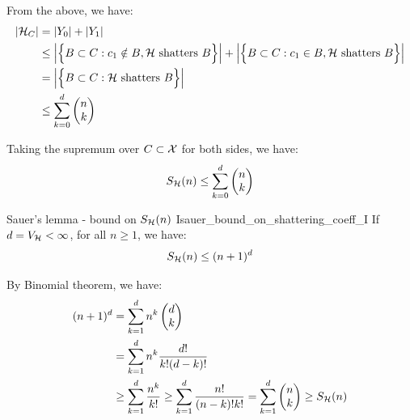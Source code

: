 \begin{proof*}
\begin{itemize}
        \noindent From the above, we have:
        \begin{align*}
            |\mathcal{H}_C| &= |Y_0| + |Y_1| \\
                &\le \Big| 
                    \Big\{ 
                        B \subset C : c_1 \notin B, \mathcal{H} \text{ shatters } B
                     \Big\}
                 \Big| + \Big| 
                    \Big\{ 
                        B \subset C : c_1\in B, \mathcal{H} \text{ shatters } B
                     \Big\}
                 \Big| \\
                &= \Big| 
                    \Big\{ 
                        B \subset C : \mathcal{H} \text{ shatters } B
                     \Big\}
                 \Big| \\
                &\le \sum_{k=0}^d \begin{pmatrix}
                    n\\k
                \end{pmatrix}
        \end{align*}

        \noindent Taking the supremum over $C\subset\mathcal{X}$ for both sides, we have:
        \begin{align*}
            S_{\mathcal{H}}(n) \le \sum_{k=0}^d \begin{pmatrix}
                n\\k
            \end{pmatrix}
        \end{align*}
    \end{itemize}
\end{proof*}

\begin{corollary}{Sauer's lemma - bound on $S_{\mathcal{H}}(n)$ I}{sauer_bound_on_shattering_coeff_I}
    If $d=V_{\mathcal{H}} < \infty$, for all $n\ge1$, we have:
    \begin{align*}
        S_{\mathcal{H}}(n) \le (n+1)^d
    \end{align*}
\end{corollary}

\begin{proof*}
    By Binomial theorem, we have:
    \begin{align*}
        (n+1)^d &= \sum_{k=1}^d n^k \begin{pmatrix} d \\ k \end{pmatrix} \\
        &= \sum_{k=1}^d n^k \frac{d!}{k!(d-k)!} \\
        &\ge \sum_{k=1}^d \frac{n^k}{k!} \ge \sum_{k=1}^d\frac{n!}{(n-k)!k!} = \sum_{k=1}^d \begin{pmatrix}
            n \\ k
        \end{pmatrix} \ge S_{\mathcal{H}}(n)
    \end{align*}
\end{proof*}

